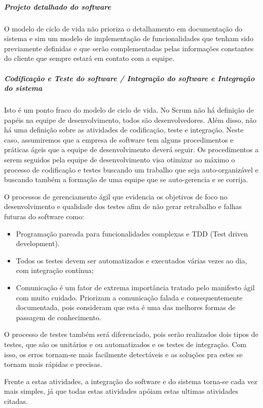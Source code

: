 \subparagraph{Projeto detalhado do software}

O modelo de ciclo de vida não prioriza o detalhamento em documentação do sistema e sim um modelo de implementação de funcionalidades que tenham sido previamente definidas e que serão complementadas pelas informações constantes do cliente que sempre estará em contato com a equipe.

\subparagraph{Codificação e Teste do software / Integração do software e Integração do sistema}


Isto é um ponto fraco do modelo de ciclo de vida. No Scrum não há definição de papéis na equipe de desenvolvimento, todos são desenvolvedores. Além disso, não há uma definição sobre as atividades de codificação, teste e integração. Neste caso, assumiremos que a empresa de software tem alguns procedimentos e práticas ágeis que a equipe de desenvolvimento deverá seguir. Os procedimentos a serem seguidos pela equipe de desenvolvimento visa otimizar ao máximo o processo de codificação e testes buscando um trabalho que seja auto-organizável e buscando também a formação de uma equipe que se auto-gerencia e se corrija.

O processos de gerenciamento ágil que evidencia os objetivos de foco no desenvolvimento e qualidade
dos testes afim de não gerar retrabalho e falhas futuras do software como:
\begin{itemize}
  \item Programação pareada para funcionalidades complexas e TDD (Test driven development).
  \item Todos os testes devem ser automatizados e executados várias vezes ao dia, com integração contínua;
  \item Comunicação é um fator de extrema importância tratado pelo manifesto ágil\cite{beck2001agile} com muito cuidado. Priorizam a comunicação falada e consequentemente documentada, pois consideram que esta é uma das melhores formas de passagem de conhecimento.
\end{itemize}

O processo de testes também será diferenciado, pois serão realizados dois tipos de testes, que são os unitários e ou automatizados e os testes de integração. Com isso, os erros tornam-se mais facilmente detectáveis e as soluções pra estes se tornam mais rápidas e precisas.

Frente a estas atividades, a integração do software e do sistema torna-se cada vez mais simples, já que todas estas atividades apóiam estas ultimas atividades citadas.






